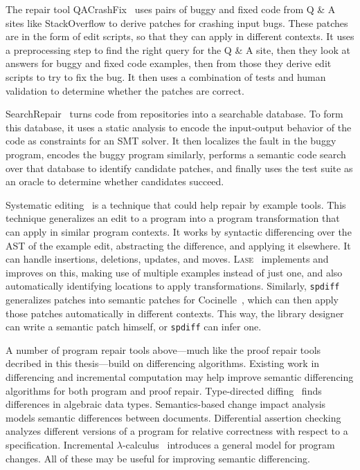 The repair tool QACrashFix~\cite{gao2015fixing} uses pairs of buggy and fixed code from Q \& A sites like
StackOverflow to derive patches for crashing input bugs. These patches are in the form of edit scripts,
so that they can apply in different contexts. %
It uses a preprocessing step to find the right query for the Q \& A site, then they
look at answers for buggy and fixed code examples, then from those they derive edit scripts to try to fix the bug.
It then uses a combination of tests and human validation to determine whether the patches are correct.

SearchRepair~\cite{Ke:2015:RPS:2916135.2916260} turns code from repositories into a searchable database.
To form this database, it uses a static analysis to encode the input-output behavior of the code as constraints for an SMT solver.
It then localizes the fault in the buggy program,
encodes the buggy program similarly, performs a semantic code search over that database to identify candidate patches,
and finally uses the test suite as an oracle to determine whether candidates succeed.

Systematic editing~\cite{meng2011systematic} is a technique that could help repair by example tools.
This technique generalizes an edit to a program into a program transformation that can apply in similar program contexts.
It works by syntactic differencing over the AST of the example edit, abstracting the difference, and applying it elsewhere.
It can handle insertions, deletions, updates, and moves.
\textsc{Lase}~\cite{meng2013lase} implements and improves on this,
making use of multiple examples instead of just one, %
and also automatically identifying locations to apply transformations.
Similarly, \lstinline{spdiff}~\cite{andersen2010generic} generalizes patches into semantic patches for Cocinelle~\cite{padioleau2008documenting},
which can then apply those patches automatically in different contexts. This way, the library designer can write a semantic patch
himself, or \lstinline{spdiff} can infer one.

A number of program repair tools above---much like the proof repair tools decribed in this thesis---build on differencing algorithms.
Existing work in differencing and incremental computation may help 
improve semantic differencing algorithms for both program and proof repair.
Type-directed diffing~\cite{Miraldo:2017:TDS:3122975.3122976}
finds differences in algebraic data types.
Semantics-based change impact analysis~\cite{Autexier:2010:SCI:1860559.1860580} models semantic differences
between documents.
Differential assertion checking~\cite{differential-assertion-checking-2} analyzes different
versions of a program for relative correctness with respect to a specification.
Incremental $\lambda$-calculus~\cite{Cai:2014:TCH:2594291.2594304} introduces a general model for program changes.
All of these may be useful for improving semantic differencing.

